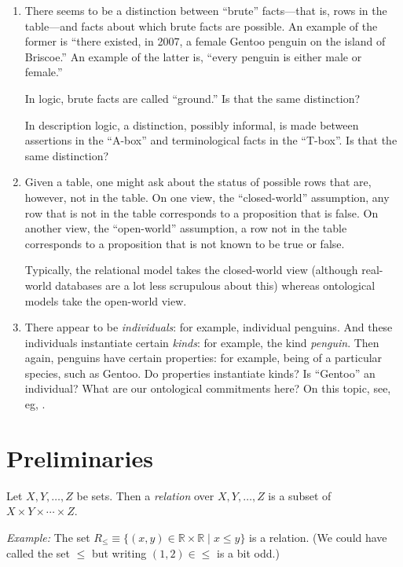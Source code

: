 \documentclass[10pt, a4paper, twocolumn]{article}
\begin{document}
\begin{enumerate}
  \item There seems to be a distinction between ``brute'' facts---that is, rows in the
table---and facts about which brute facts are possible. An example of the former
is ``there existed, in 2007, a female Gentoo penguin on the island of Briscoe.''
An example of the latter is, ``every penguin is either male or female.''

In logic, brute facts are called ``ground.'' Is that the same distinction?

In description logic, a distinction, possibly informal, is made between
assertions in the ``A-box'' and terminological facts in the ``T-box''. Is that
the same distinction?

\item Given a table, one might ask about the status of possible rows that are,
  however, not in the table. On one view, the ``closed-world'' assumption, any
  row that is not in the table corresponds to a proposition that is false. On
  another view, the ``open-world'' assumption, a row not in the table
  corresponds to a proposition that is not known to be true or false.

  Typically, the relational model takes the closed-world view (although
  real-world databases are a lot less scrupulous about this) whereas ontological
  models take the open-world view.

\item There appear to be \emph{individuals}: for example, individual
  penguins. And these individuals instantiate certain \emph{kinds}: for example,
  the kind \emph{penguin}. Then again, penguins have certain properties: for
  example, being of a particular species, such as Gentoo. Do properties
  instantiate kinds? Is ``Gentoo'' an individual? What are our ontological
  commitments here? On this topic, see, eg, \textcite{lowe2005four}.

\end{enumerate}


\section{Preliminaries}

Let $X, Y, \dots, Z$ be sets. Then a \emph{relation} over $X, Y, \dots, Z$ is a
subset of $X\times Y\times\dotsm\times Z$.

\emph{Example:} The set $R_\leq \equiv \{(x, y)\in\mathbb{R}\times\mathbb{R} \mid x\leq y\}$ is a
relation. (We could have called the set $\leq$ but writing $(1, 2)\in\leq$ is a bit odd.)
\end{document}
